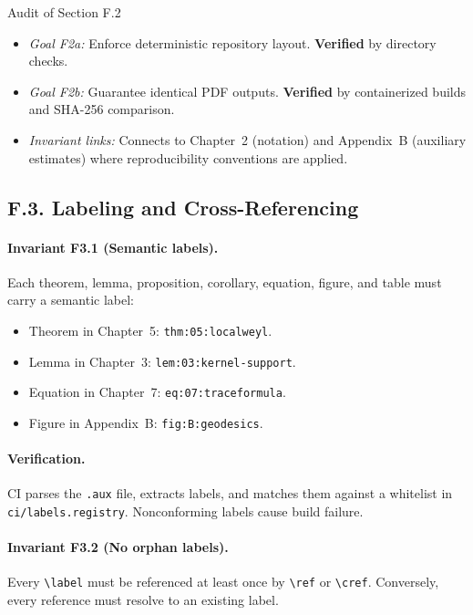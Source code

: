 \begin{auditblock}{Audit of Section F.2}
\leavevmode
\begin{itemize}
  \item \emph{Goal F2a:} Enforce deterministic repository layout.
        \textbf{Verified} by directory checks.
  \item \emph{Goal F2b:} Guarantee identical PDF outputs.
        \textbf{Verified} by containerized builds and SHA-256 comparison.
  \item \emph{Invariant links:} Connects to Chapter~2 (notation) and
        Appendix~B (auxiliary estimates) where reproducibility
        conventions are applied.
\end{itemize}
\end{auditblock}

\subsection*{F.3. Labeling and Cross-Referencing}

\paragraph{Invariant F3.1 (Semantic labels).}
Each theorem, lemma, proposition, corollary, equation, figure, and
table must carry a semantic label:
\begin{itemize}
  \item Theorem in Chapter~5: \texttt{thm:05:localweyl}.
  \item Lemma in Chapter~3: \texttt{lem:03:kernel-support}.
  \item Equation in Chapter~7: \texttt{eq:07:traceformula}.
  \item Figure in Appendix~B: \texttt{fig:B:geodesics}.
\end{itemize}

\paragraph{Verification.}
CI parses the \texttt{.aux} file, extracts labels, and matches them
against a whitelist in \texttt{ci/labels.registry}. Nonconforming labels
cause build failure.

\paragraph{Invariant F3.2 (No orphan labels).}
Every \texttt{\textbackslash label} must be referenced at least once by
\texttt{\textbackslash ref} or \texttt{\textbackslash cref}.
Conversely, every reference must resolve to an existing label.

